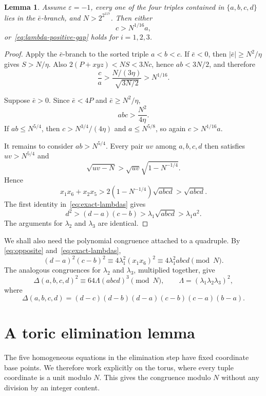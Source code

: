 \documentclass[11pt]{amsart}
\newtheorem{lemma}[theorem]{Lemma}
\theoremstyle{remark}
\newcommand{\eps}{\varepsilon}
\begin{document}
\begin{lemma}%
\label{lem:negative-lambda}
Assume $\eps=-1$, every one of the four triples contained in
$\{a,b,c,d\}$ lies in the $\bar e$-branch, and $N>2^{2^{117}}$.
Then either
\[
 c>N^{1/16}a,
\]
or~\eqref{eq:lambda-positive-gap} holds for $i=1,2,3$.
\end{lemma}

\begin{proof}
Apply the $\bar e$-branch to the sorted triple $a<b<c$. If $\bar e<0$, then
$|\bar e|\ge N^2/\eta$ gives $S>N/\eta$. Also
$2(P+xyz)<NS<3Nc$, hence $ab<3N/2$, and therefore
\[
 \frac ca>\frac{N/(3\eta)}{\sqrt{3N/2}}>N^{1/16}.
\]

Suppose $\bar e>0$. Since $\bar e<4P$ and
$\bar e\ge N^2/\eta$,
\[
 abc>\frac{N^2}{4\eta}.
\]
If $ab\le N^{5/4}$, then $c>N^{3/4}/(4\eta)$ and
$a\le N^{5/8}$, so again $c>N^{1/16}a$.

It remains to consider $ab>N^{5/4}$. Every pair $uv$ among $a,b,c,d$
then satisfies $uv>N^{5/4}$ and
\[
 \sqrt{uv-N}>\sqrt{uv}\sqrt{1-N^{-1/4}}.
\]
Hence
\[
 x_1x_6+x_2x_5
 >2(1-N^{-1/4})\sqrt{abcd}>\sqrt{abcd}.
\]
The first identity in~\eqref{eq:exact-lambdas} gives
\[
 d^2>(d-a)(c-b)>\lambda_1\sqrt{abcd}>\lambda_1a^2.
\]
The arguments for $\lambda_2$ and $\lambda_3$ are identical.
\end{proof}

We shall also need the polynomial congruence attached to a quadruple. By
\eqref{eq:opposite} and~\eqref{eq:exact-lambdas},
\[
 (d-a)^2(c-b)^2
 \equiv4\lambda_1^2(x_1x_6)^2
 \equiv4\lambda_1^2abcd\pmod N.
\]
The analogous congruences for $\lambda_2$ and $\lambda_3$, multiplied
together, give
\begin{equation}\label{eq:quadruple-congruence}
 \Delta(a,b,c,d)^2\equiv64\Lambda(abcd)^3\pmod N,
 \qquad
 \Lambda=(\lambda_1\lambda_2\lambda_3)^2,
\end{equation}
where
\[
 \Delta(a,b,c,d)=
 (d-c)(d-b)(d-a)(c-b)(c-a)(b-a).
\]

\section{A toric elimination lemma}

The five homogeneous equations in the elimination step have fixed coordinate
base points. We therefore work explicitly on the torus, where every tuple
coordinate is a unit modulo $N$. This gives the congruence modulo $N$
without any division by an integer content.
\end{document}
